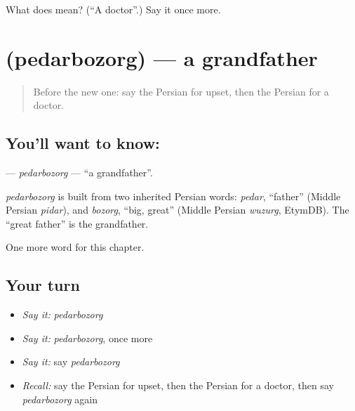\begin{tcolorbox}[breakable,colback=teal!4,colframe=teal!35!black,title={Before you move on}]
What does  mean? (\textquotedblleft{}A doctor\textquotedblright{}.) Say it once more.
\end{tcolorbox}
\section[\texorpdfstring{\fa{پدربزرگ} (pedarbozorg)}{پدربزرگ (pedarbozorg)}]{ (pedarbozorg) — a grandfather}

\label{lesson:FA-C32-pedarbozorg}



\begin{quote}
Before the new one: say the Persian for upset, then the Persian for a doctor.
\end{quote}

\subsection*{You'll want to know: }
\textbf{} — \emph{pedarbozorg} — \textquotedblleft{}a grandfather\textquotedblright{}.

\begin{cousinweb}
\emph{pedarbozorg} is built from two inherited Persian words: \emph{pedar}, \textquotedblleft{}father\textquotedblright{} (Middle Persian \emph{pidar}), and \emph{bozorg}, \textquotedblleft{}big, great\textquotedblright{} (Middle Persian \emph{wuzurg}, EtymDB). The \textquotedblleft{}great father\textquotedblright{} is the grandfather.
\end{cousinweb}

\begin{grammarlens}[title={What you've built}]
One more word for this chapter.
\end{grammarlens}

\subsection*{Your turn}
\begin{itemize}
\raggedright
  \item \emph{Say it:} \emph{pedarbozorg}
  \item \emph{Say it:} \emph{pedarbozorg}, once more
  \item \emph{Say it:} say \emph{pedarbozorg}
  \item \emph{Recall:} say the Persian for upset, then the Persian for a doctor, then say \emph{pedarbozorg} again
\end{itemize}

